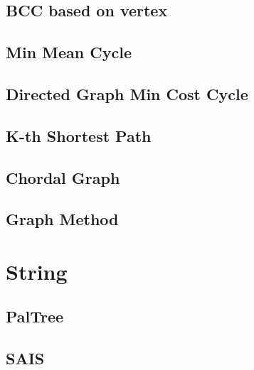 \documentclass[a4paper,10pt,twocolumn,oneside]{article}
\begin{document}
\subsection{BCC based on vertex}


\subsection{Min Mean Cycle}


\subsection{Directed Graph Min Cost Cycle}


\subsection{K-th Shortest Path}


%

\subsection{Chordal Graph}


\subsection{Graph Method}


\section{String}
\subsection{PalTree}


%

\subsection{SAIS}

\end{document}
